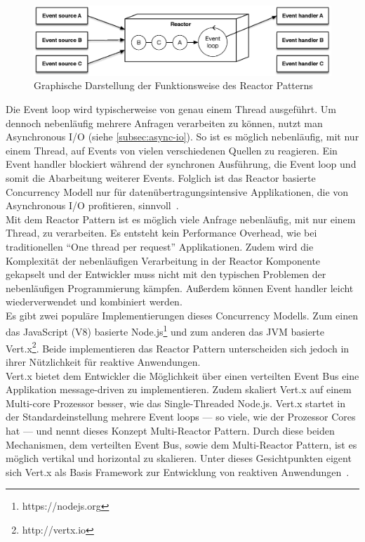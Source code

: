 \begin{figure}[H]
 \centering
 \includegraphics[width=1.0\textwidth]{4-Hauptteil/event-loop/event-loop.eps}
 \caption{Graphische Darstellung der Funktionsweise des Reactor Patterns}
 \label{fig:event-loop}
\end{figure}

Die Event loop wird typischerweise von genau einem Thread ausgeführt. Um dennoch nebenläufig mehrere Anfragen verarbeiten zu können, nutzt man Asynchronous I/O (siehe \ref{subsec:async-io}). So ist es möglich nebenläufig, mit nur einem Thread, auf Events von vielen verschiedenen Quellen zu reagieren. Ein Event handler blockiert während der synchronen Ausführung, die Event loop und somit die Abarbeitung weiterer Events. Folglich ist das Reactor basierte Concurrency Modell nur für datenübertragungsintensive Applikationen, die von Asynchronous I/O profitieren, sinnvoll~\cite[S.~73]{kuhn_reactive_2015}.\\
Mit dem Reactor Pattern ist es möglich viele Anfrage nebenläufig, mit nur einem Thread, zu verarbeiten. Es entsteht kein Performance Overhead, wie bei traditionellen \enquote{One thread per request} Applikationen. Zudem wird die Komplexität der nebenläufigen Verarbeitung in der Reactor Komponente gekapselt und der Entwickler muss nicht mit den typischen Problemen der nebenläufigen Programmierung kämpfen. Außerdem können Event handler leicht wiederverwendet und kombiniert werden.\\
Es gibt zwei populäre Implementierungen dieses Concurrency Modells. Zum einen das JavaScript (V8) basierte Node.js\footnote{https://nodejs.org} und zum anderen das JVM basierte Vert.x\footnote{http://vertx.io}. Beide implementieren das Reactor Pattern unterscheiden sich jedoch in ihrer Nützlichkeit für reaktive Anwendungen.\\
Vert.x bietet dem Entwickler die Möglichkeit über einen verteilten Event Bus eine Applikation message-driven zu implementieren. Zudem skaliert Vert.x auf einem Multi-core Prozessor besser, wie das Single-Threaded Node.js. Vert.x startet in der Standardeinstellung mehrere Event loops --- so viele, wie der Prozessor Cores hat --- und nennt dieses Konzept Multi-Reactor Pattern. Durch diese beiden Mechanismen, dem verteilten Event Bus, sowie dem Multi-Reactor Pattern, ist es möglich vertikal und horizontal zu skalieren. Unter dieses Gesichtpunkten eigent sich Vert.x als Basis Framework zur Entwicklung von reaktiven Anwendungen~\cite[S.~74]{kuhn_reactive_2015}.

